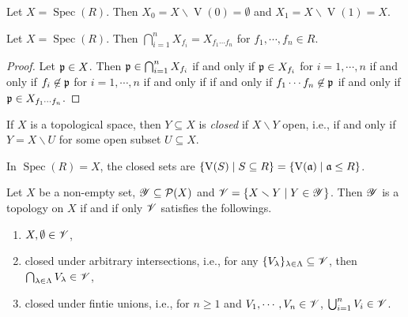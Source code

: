 \begin{fact}\label{2.8}
    Let $X = \operatorname{Spec}(R)$. Then $X_0 = X \smallsetminus \operatorname{V}(0) = \emptyset$ and $X_1 = X \smallsetminus \operatorname{V}(1) = X$.
\end{fact}

\begin{proposition}\label{2.9}
    Let $X = \operatorname{Spec}(R)$. Then $\bigcap_{i=1}^n X_{f_i} = X_{f_1 \cdots f_n}$ for $f_1,\cdots,f_n \in R$.
\end{proposition}

\begin{proof}
    Let $\mathfrak{p} \in X$. Then $\mathfrak{p} \in \bigcap_{i=1}^n X_{f_i}$ if and only if $\mathfrak{p} \in X_{f_i}$ for $i = 1,\cdots,n$ if and only if $f_i \not \in \mathfrak{p}$ for $i = 1,\cdots,n$ if and only if if and only if $f_1 \cdots f_n \not \in \mathfrak{p}$ if and only if $\mathfrak{p} \in X_{f_1 \cdots f_n}$.
\end{proof}

\begin{definition}\label{2.10}
    If $X$ is a topological space, then $Y \subseteq X$ is \emph{closed} if $X \smallsetminus Y$ open, i.e., if and only if $Y = X \smallsetminus U$ for some open subset $U \subseteq X$.
\end{definition}

\begin{example}\label{2.11}
    In $\operatorname{Spec}(R) = X$, the closed sets are $\{\operatorname{V}(S) \mid S \subseteq R\} = \{\operatorname{V}(\mathfrak{a}) \mid \mathfrak{a} \leq R\}$.
\end{example}

\begin{proposition}\label{2.12}
    Let $X$ be a non-empty set, $\mathscr{Y} \subseteq \mathcal{P}(X)$ and $\mathscr{V} = \{X \smallsetminus Y \mid Y \in \mathscr{Y}\}$. Then $\mathscr{Y}$ is a topology on $X$ if and if only $\mathscr{V}$ satisfies the followings.
    \begin{enumerate}
        \item $X,\emptyset \in \mathscr{V}$,
        \item closed under arbitrary intersections, i.e., for any $\{V_\lambda\}_{\lambda \in \Lambda} \subseteq \mathscr{V}$, then $\bigcap_{\lambda \in \Lambda} V_\lambda \in \mathscr{V}$,
        \item closed under fintie unions, i.e., for $n \geq 1$ and $V_1,\cdots,V_n \in \mathscr{V}$, $\bigcup_{i=1}^n V_i \in \mathscr{V}$.
    \end{enumerate}
\end{proposition}

